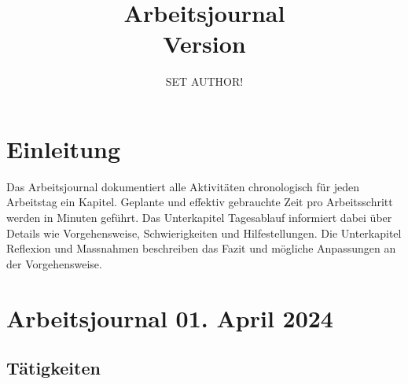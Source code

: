 


\makeglossaries





\title{Arbeitsjournal\\
	\small{Version \vhCurrentVersion}}
\author{SET AUTHOR!}
\date{\vhCurrentDate}


\setcounter{tocdepth}{1}


	\maketitle
	
	\tableofcontents
	\newpage
	
	\section{Einleitung}
	Das Arbeitsjournal dokumentiert alle Aktivitäten chronologisch für jeden Arbeitstag ein Kapitel. Geplante und effektiv gebrauchte Zeit pro Arbeitsschritt werden in Minuten geführt. Das Unterkapitel Tagesablauf informiert dabei über Details wie Vorgehensweise, Schwierigkeiten und Hilfestellungen. Die Unterkapitel Reflexion und Massnahmen beschreiben das Fazit und mögliche Anpassungen an der Vorgehensweise.
	
	\section{Arbeitsjournal 01. April 2024}
	
	\subsection{Tätigkeiten}
	
